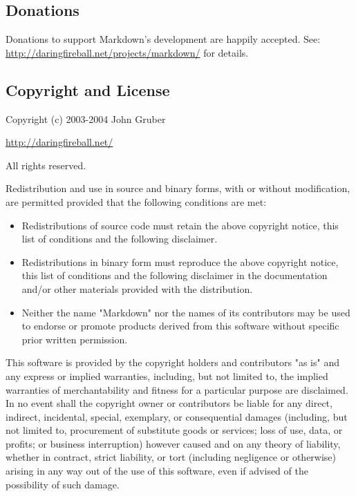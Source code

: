 \subsection*{Donations}




Donations to support Markdown's development are happily accepted. See:
\href{http://daringfireball.net/projects/markdown/}{http://daringfireball.net/projects/markdown/} for details.

\subsection*{Copyright and License}




Copyright (c) 2003-2004 John Gruber 


\href{http://daringfireball.net/}{http://daringfireball.net/} 


All rights reserved.



Redistribution and use in source and binary forms, with or without
modification, are permitted provided that the following conditions are
met:

\begin{itemize}
\item 

Redistributions of source code must retain the above copyright notice,
this list of conditions and the following disclaimer.
\item 

Redistributions in binary form must reproduce the above copyright
notice, this list of conditions and the following disclaimer in the
documentation and/or other materials provided with the distribution.
\item 

Neither the name "Markdown" nor the names of its contributors may
be used to endorse or promote products derived from this software
without specific prior written permission.
\end{itemize}




This software is provided by the copyright holders and contributors "as
is" and any express or implied warranties, including, but not limited
to, the implied warranties of merchantability and fitness for a
particular purpose are disclaimed. In no event shall the copyright owner
or contributors be liable for any direct, indirect, incidental, special,
exemplary, or consequential damages (including, but not limited to,
procurement of substitute goods or services; loss of use, data, or
profits; or business interruption) however caused and on any theory of
liability, whether in contract, strict liability, or tort (including
negligence or otherwise) arising in any way out of the use of this
software, even if advised of the possibility of such damage.
